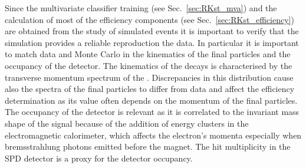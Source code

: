 Since the multivariate classifier training (see Sec.~\ref{sec:RKst_mva}) and the calculation
of most of the efficiency components (see Sec.~\ref{sec:RKst_efficiency}) are obtained from
the study of simulated events it is important to verify that the simulation provides a reliable
reproduction the data. In particular it is important to match data and Monte Carlo
in the kinematics of the final particles and the occupancy of the detector.
The kinematics of the decays is characterised by the transverse momentum spectrum of
the \Bz. Discrepancies in this distribution cause also the spectra of the final particles
to differ from data and affect the efficiency determination as its value often
depends on the momentum of the final particles.
The occupancy of the detector is relevant as it is correlated to the invariant mass shape of the signal
because of the addition of energy clusters in the electromagnetic calorimeter,
which affects the electron's momenta especially when bremsstrahlung photons emitted before the magnet.
The hit multiplicity in the SPD detector is a proxy for the detector occupancy.

